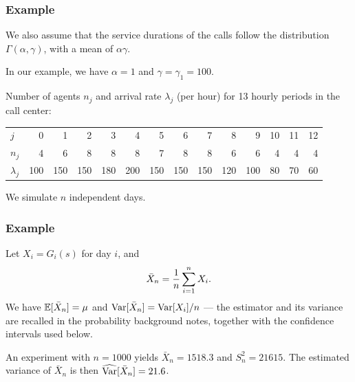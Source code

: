\documentclass[t,usepdftitle=false,aspectratio=169]{beamer}
\begin{document}
\begin{frame}
	\frametitle{Example}
	
	We also assume that the service durations of the calls follow the distribution 
	\(\Gamma(\alpha,\gamma)\), with a mean of \(\alpha\gamma\).
	
	\mbox{}
	
	In our example, we have \(\alpha = 1\) and \(\gamma = {\gamma_1} = 100\).
	
	\mbox{}
	
	Number of agents \(n_j\) and arrival rate \(\lambda_j\) (per hour) for 13 hourly periods in the call center:
	
	\begin{footnotesize}
		\hspace*{-1cm}
		\begin{tabular}{l|rrrrrrrrrrrrr}
			\hline
			$j$   & 0 & 1 & 2 & 3 & 4 & 5 & 6 & 7 & 8 & 9 & 10 & 11 & 12 \\
			$n_j$ & 4 & 6 & 8 & 8 & 8 & 7 & 8 & 8 & 6 &  6 &  4 &  4 &  4 \\
			$\lambda_j$ & 100 & 150 & 150 & 180 & 200 & 150 & 150 & 150 & 
			120 & 100 & 80 & 70 & 60 \\
			\hline
		\end{tabular}
	\end{footnotesize}
	
	\mbox{}
	
	We simulate \(n\) independent days.
	
\end{frame}

\begin{frame}
	\frametitle{Example}
	
	Let ${X_i} = G_i(s)$ for day $i$, and 
	\[
	{\bar X_n} = {1\over n} \sum_{i=1}^n X_i.
	\]
	We have ${\mathbb{E}}[\bar X_n] = \mu$ and $\operatorname{Var}[\bar X_n] = \operatorname{Var}[X_i]/n$ --- the estimator and its
	variance are recalled in the {\red probability background notes}, together with the
	confidence intervals used below.
	
	\mbox{}
	
	An experiment with ${n = 1000}$ yields $\bar X_n = 1518.3$ and $S_n^2
	= {21615}$.
	The estimated variance of $\bar X_n$ is then $\widehat{\operatorname{Var}}[\bar X_n] = 21.6$.
	
\end{frame}
\end{document}
